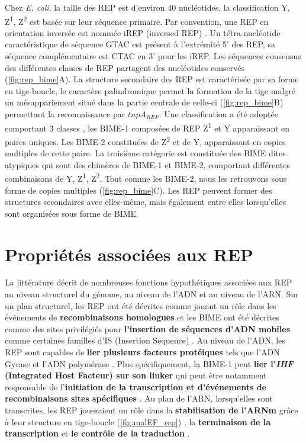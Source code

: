 \documentclass[12pt,a4paper]{report}
\begin{document}
\begin{onehalfspace}
Chez \textit{E. coli}, la taille des REP est d'environ 40 nucléotides, la classification Y, Z\textsuperscript{1}, Z\textsuperscript{2} est basée sur leur séquence primaire. Par convention, une REP en orientation inversée est nommée iREP (inversed REP) \citep{Ton-Hoang2012}. Un tétra-nucléotide caractéristique de séquence GTAC est présent à l'extrémité 5' des REP, sa séquence complémentaire est CTAC en 3' pour les iREP. Les séquences consensus des différentes classes de REP partagent des nucléotides conservés (\autoref{fig:rep_bime}A). La structure secondaire des REP est caractérisée par sa forme en tige-boucle, le caractère palindromique permet la formation de la tige malgré un mésappariement situé dans la partie centrale de celle-ci (\autoref{fig:rep_bime}B) permettant la reconnaissance par $tnpA_{REP}$. Une classification a été adoptée comportant 3 classes \citep{Bachellier1997}, les BIME-1 composées de REP Z\textsuperscript{1} et Y apparaissant en paires uniques. Les BIME-2 constituées de Z\textsuperscript{2} et de Y, apparaissant en copies multiples de cette paire. La troisième catégorie est constituée des BIME dites atypiques qui sont des chimères de BIME-1 et BIME-2, comportant différentes combinaisons de Y, Z\textsuperscript{1}, Z\textsuperscript{2}. Tout comme les BIME-2, nous les retrouvons sous forme de copies multiples (\autoref{fig:rep_bime}C). Les REP peuvent former des structures secondaires avec elles-même, mais également entre elles lorsqu'elles sont organisées sous forme de BIME.

\section*{Propriétés associées aux REP}

La littérature décrit de nombreuses fonctions hypothétiques associées aux REP au niveau structurel du génome, au niveau de l'ADN et au niveau de l'ARN. Sur un plan structurel, les REP ont été décrites comme jouant un rôle dans les événements de \textbf{recombinaisons homologues} \citep{Kofoid2003} et les BIME ont été décrites comme des sites privilégiés pour \textbf{l'insertion de séquences d'ADN mobiles} comme certaines familles d'IS (Insertion Sequence) \citep{Bachellier1997,Clement1999,Choi2003,Tobes2005}. Au niveau de l'ADN, les REP sont capables de \textbf{lier plusieurs facteurs protéiques} tels que l'ADN Gyrase \citep{Espeli1997} et l'ADN polymérase \citep{Gilson1990}. Plus spécifiquement, la BIME-1 peut \textbf{lier l'\textit{IHF} (Integrated Host Facteur) sur son linker} \citep{Boccard1993} qui peut être notamment responsable de l'\textbf{initiation de la transcription et d’événements de recombinaisons sites spécifiques} \citep{Goosen1995}. Au plan de l'ARN, lorsqu'elles sont transcrites, les REP joueraient un rôle dans la \textbf{stabilisation de l'ARNm} grâce à leur structure en tige-boucle (\autoref{fig:malEF_rep}) \citep{Newbury1987,Espeli2001,Khemici2004,Aguena2009}, la \textbf{terminaison de la transcription} \citep{Gilson1986} et \textbf{le contrôle de la traduction} \citep{Stern1988}. 


\end{onehalfspace}
\end{document}
